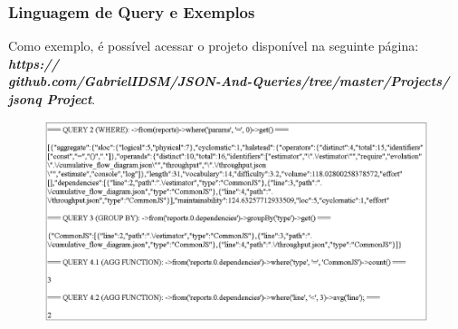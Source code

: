 \documentclass[a4paper, 12pt] {article}
\begin{document}
			\subsubsection{Linguagem de Query e Exemplos}
				Como exemplo, é possível acessar o projeto disponível na seguinte página: \textbf{\textit{https://\\github.com/GabrielIDSM/JSON-And-Queries/tree/master/Projects/\\jsonq Project}}.
			\begin{figure}[H]
				\centering
				\includegraphics[width=16cm]{jsonq.png}
				\label{figure:Image}
			\end{figure}
\end{document}
